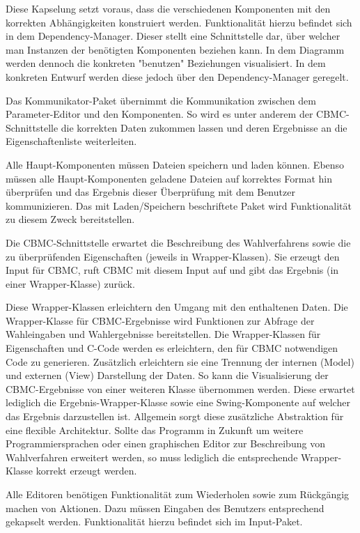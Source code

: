 \documentclass[a4paper]{scrreprt}
\begin{document}
Diese Kapselung setzt voraus, dass die verschiedenen Komponenten mit den korrekten Abhängigkeiten konstruiert werden. Funktionalität hierzu befindet sich in dem Dependency-Manager. Dieser stellt eine Schnittstelle dar, über welcher man Instanzen der benötigten Komponenten beziehen kann. In dem Diagramm werden dennoch die konkreten "benutzen" Beziehungen visualisiert. In dem konkreten Entwurf werden diese jedoch über den Dependency-Manager geregelt. 

Das Kommunikator-Paket übernimmt die Kommunikation zwischen dem Parameter-Editor und den Komponenten. So wird es unter anderem der CBMC-Schnittstelle die korrekten Daten zukommen lassen und deren Ergebnisse an die Eigenschaftenliste weiterleiten.

Alle Haupt-Komponenten müssen Dateien speichern und laden können. Ebenso müssen alle Haupt-Komponenten geladene Dateien auf korrektes Format hin überprüfen und das Ergebnis dieser Überprüfung mit dem Benutzer kommunizieren. Das mit Laden/Speichern beschriftete Paket wird Funktionalität zu diesem Zweck bereitstellen. 

Die CBMC-Schnittstelle erwartet die Beschreibung des Wahlverfahrens sowie die zu überprüfenden Eigenschaften (jeweils in Wrapper-Klassen). Sie erzeugt den Input für CBMC, ruft CBMC mit diesem Input auf und gibt das Ergebnis (in einer Wrapper-Klasse) zurück.

Diese Wrapper-Klassen erleichtern den Umgang mit den enthaltenen Daten. Die Wrapper-Klasse für CBMC-Ergebnisse wird Funktionen zur Abfrage der Wahleingaben und Wahlergebnisse bereitstellen. Die Wrapper-Klassen für Eigenschaften und C-Code werden es erleichtern, den für CBMC notwendigen Code zu generieren. Zusätzlich erleichtern sie eine Trennung der internen (Model) und externen (View) Darstellung der Daten. So kann die Visualisierung der CBMC-Ergebnisse von einer weiteren Klasse übernommen werden. Diese erwartet lediglich die Ergebnis-Wrapper-Klasse sowie eine Swing-Komponente auf welcher das Ergebnis darzustellen ist. Allgemein sorgt diese zusätzliche  Abstraktion für eine flexible Architektur. Sollte das Programm in Zukunft um weitere Programmiersprachen oder einen graphischen Editor zur Beschreibung von Wahlverfahren erweitert werden, so muss lediglich die entsprechende Wrapper-Klasse korrekt erzeugt werden.

Alle Editoren benötigen Funktionalität zum Wiederholen sowie zum Rückgängig machen von Aktionen. Dazu müssen Eingaben des Benutzers entsprechend gekapselt werden. Funktionalität hierzu befindet sich im Input-Paket.
\end{document}
